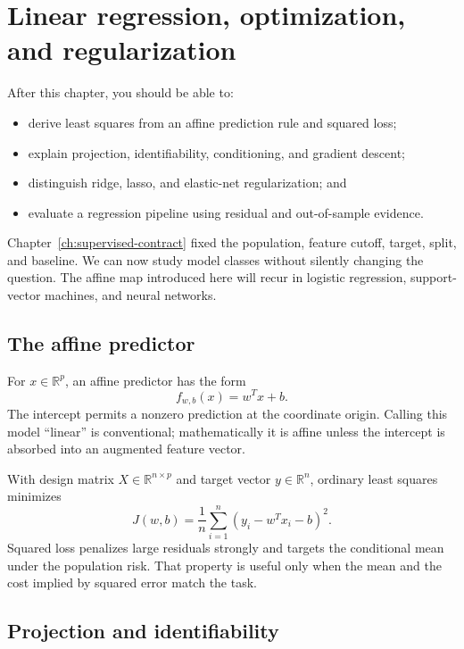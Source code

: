 \chapter{Linear regression, optimization, and regularization}
\label{ch:linear-regression}

\begin{learningobjectives}
After this chapter, you should be able to:
\begin{itemize}
  \item derive least squares from an affine prediction rule and squared loss;
  \item explain projection, identifiability, conditioning, and gradient descent;
  \item distinguish ridge, lasso, and elastic-net regularization; and
  \item evaluate a regression pipeline using residual and out-of-sample evidence.
\end{itemize}
\end{learningobjectives}

\begin{chapterconnection}
Chapter~\ref{ch:supervised-contract} fixed the population, feature cutoff,
target, split, and baseline. We can now study model classes without silently
changing the question. The affine map introduced here will recur in logistic
regression, support-vector machines, and neural networks.
\end{chapterconnection}

\section{The affine predictor}

For $x\in\mathbb{R}^p$, an affine predictor has the form
\[
f_{w,b}(x)=w^Tx+b.
\]
The intercept permits a nonzero prediction at the coordinate origin. Calling
this model ``linear'' is conventional; mathematically it is affine unless the
intercept is absorbed into an augmented feature vector.

With design matrix $X\in\mathbb{R}^{n\times p}$ and target vector
$y\in\mathbb{R}^n$, ordinary least squares minimizes
\[
J(w,b)=\frac{1}{n}\sum_{i=1}^n(y_i-w^Tx_i-b)^2.
\]
Squared loss penalizes large residuals strongly and targets the conditional mean
under the population risk. That property is useful only when the mean and the
cost implied by squared error match the task.

\section{Projection and identifiability}

